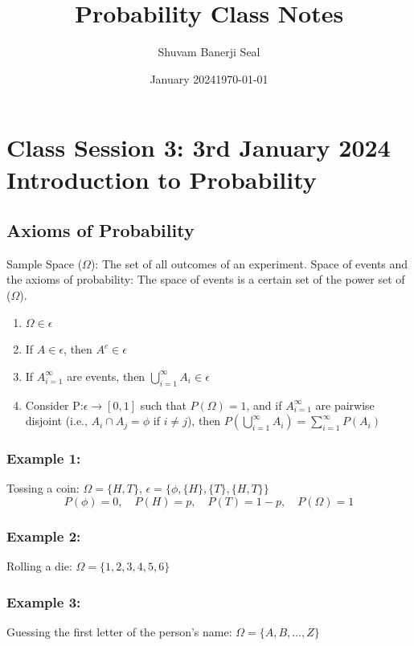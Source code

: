\documentclass{article}
\title{Probability Class Notes}
\author{Shuvam Banerji Seal}
\date{January 2024}
\date{\today} %
\theoremstyle{definition}
\begin{document}
\maketitle
\tableofcontents

\section{Class Session 3: 3rd January 2024\\ Introduction to Probability}

\subsection{Axioms of Probability}
Sample Space ($\Omega$): The set of all outcomes of an experiment.
Space of events and the axioms of probability:
The space of events is a certain set of the power set of ($\Omega$).
\begin{enumerate}
    \item $\Omega \in \epsilon$
    \item If $A \in \epsilon$, then $A^c \in \epsilon$
    \item If $A_{i=1}^{\infty}$ are events, then $\bigcup_{i=1}^{\infty} A_i \in \epsilon$
    \item Consider P:$\epsilon \to [0, 1]$ such that $P(\Omega) = 1$,
    and if $A_{i=1}^{\infty}$ are pairwise disjoint (i.e., $A_i \cap A_j = \phi$ if $i \neq j$), then
    $P\left(\bigcup_{i=1}^{\infty} A_i\right) = \sum_{i=1}^{\infty} P(A_i)$
\end{enumerate}

\subsubsection{Example 1:}
Tossing a coin: $\Omega = \{H, T\}$,
$\epsilon = \{\phi, \{H\}, \{T\}, \{H, T\}\}$
\[ P(\phi) = 0, \quad P(H) = p, \quad P(T) = 1-p, \quad P(\Omega) = 1 \]

\subsubsection{Example 2:}
Rolling a die: $\Omega = \{1,2,3,4,5,6\}$

\subsubsection{Example 3:}
Guessing the first letter of the person's name: $\Omega = \{A, B, \dots, Z\}$
\end{document}
